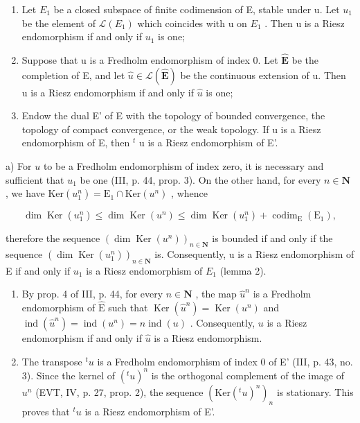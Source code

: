 \begin{enumerate}
\def\labelenumi{\alph{enumi})}
\item
   Let \(E_{1}\) be a closed subspace of finite codimension of E, stable under u. Let \(u_{1}\) be the element of \(\mathcal{L}(E_{1})\) which coincides with u on \(E_{1}\) . Then u is a Riesz endomorphism if and only if \(u_{1}\) is one;
\item
   Suppose that u is a Fredholm endomorphism of index 0. Let \(\widehat{\mathbf{E}}\) be the completion of E, and let \(\widehat{u} \in \mathcal{L}(\widehat{\mathbf{E}})\) be the continuous extension of u. Then u is a Riesz endomorphism if and only if \(\widehat{u}\) is one;
\item
 Endow the dual E' of E with the topology of bounded convergence, the topology of compact convergence, or the weak topology. If u is a Riesz endomorphism of E, then \(^{t}\) u is a Riesz endomorphism of E'.
\end{enumerate}
a) For \(u\) to be a Fredholm endomorphism of index zero, it is necessary and sufficient that \(u_1\) be one (III, p. 44, prop. 3). On the other hand, for every \(n \in \mathbf{N}\) , we have \(\mathrm{Ker}(u_1^n) = \mathrm{E}_1 \cap \mathrm{Ker}(u^n)\) , whence


\[
\dim \operatorname{Ker} (u _ {1} ^ {n}) \leqslant \dim \operatorname{Ker} (u ^ {n}) \leqslant \dim \operatorname{Ker} (u _ {1} ^ {n}) + \operatorname{codim} _ {\mathrm{E}} (\mathrm{E} _ {1}),
\]

therefore the sequence \((\dim\operatorname{Ker}(u^{n}))_{n\in\mathbf{N}}\) is bounded if and only if the sequence \((\dim\operatorname{Ker}(u_{1}^{n}))_{n\in\mathbf{N}}\) is. Consequently, u is a Riesz endomorphism of E if and only if \(u_{1}\) is a Riesz endomorphism of \(E_{1}\) (lemma 2).

\begin{enumerate}
\def\labelenumi{\alph{enumi})}
\setcounter{enumi}{1}
\item
  By prop. 4 of III, p. 44, for every \(n \in \mathbf{N}\) , the map \(\widehat{u}^n\) is a Fredholm endomorphism of \(\widehat{\mathrm{E}}\) such that \(\operatorname{Ker}(\widehat{u}^n) = \operatorname{Ker}(u^n)\) and \(\operatorname{ind}(\widehat{u}^n) = \operatorname{ind}(u^n) = n\operatorname{ind}(u)\) . Consequently, \(u\) is a Riesz endomorphism if and only if \(\widehat{u}\) is a Riesz endomorphism.
\item
  The transpose \({}^{t}u\) is a Fredholm endomorphism of index 0 of E' (III, p. 43, no. 3). Since the kernel of \((^{t}u)^{n}\) is the orthogonal complement of the image of \(u^{n}\) (EVT, IV, p. 27, prop. 2), the sequence \((\mathrm{Ker}({}^{t}u)^{n})_{n}\) is stationary. This proves that \({}^{t}u\) is a Riesz endomorphism of E'.
\end{enumerate}

